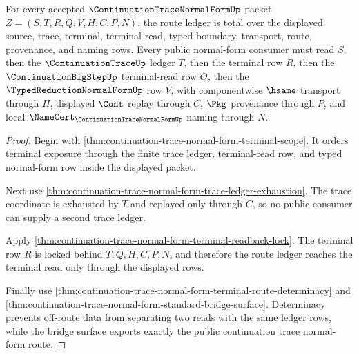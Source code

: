 \begin{theorem}
\label{thm:continuation-trace-normal-form-route-ledger-totality}
For every accepted $\ContinuationTraceNormalFormUp$ packet $Z=(S,T,R,Q,V,H,C,P,N)$, the route ledger is total over the displayed source, trace, terminal, terminal-read, typed-boundary, transport, route, provenance, and naming rows. Every public normal-form consumer must read $S$, then the $\ContinuationTraceUp$ ledger $T$, then the terminal row $R$, then the $\ContinuationBigStepUp$ terminal-read row $Q$, then the $\TypedReductionNormalFormUp$ row $V$, with componentwise $\hsame$ transport through $H$, displayed $\Cont$ replay through $C$, $\Pkg$ provenance through $P$, and local $\NameCert_{\ContinuationTraceNormalFormUp}$ naming through $N$.
\end{theorem}
\begin{proof}
Begin with \autoref{thm:continuation-trace-normal-form-terminal-scope}. It orders terminal exposure through the finite trace ledger, terminal-read row, and typed normal-form row inside the displayed packet.

Next use \autoref{thm:continuation-trace-normal-form-trace-ledger-exhaustion}. The trace coordinate is exhausted by $T$ and replayed only through $C$, so no public consumer can supply a second trace ledger.

Apply \autoref{thm:continuation-trace-normal-form-terminal-readback-lock}. The terminal row $R$ is locked behind $T,Q,H,C,P,N$, and therefore the route ledger reaches the terminal read only through the displayed rows.

Finally use \autoref{thm:continuation-trace-normal-form-terminal-route-determinacy} and \autoref{thm:continuation-trace-normal-form-standard-bridge-surface}. Determinacy prevents off-route data from separating two reads with the same ledger rows, while the bridge surface exports exactly the public continuation trace normal-form route.
\end{proof}

